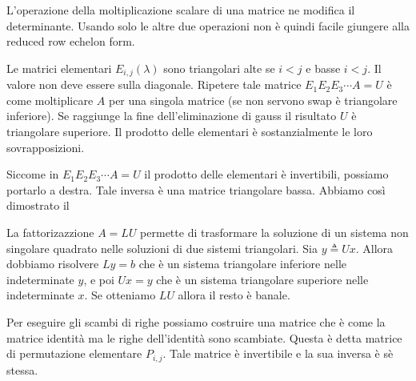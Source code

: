 \documentclass[a4paper]{article}
\begin{document}
L'operazione della moltiplicazione scalare di una matrice ne modifica il determinante.
Usando solo le altre due operazioni non è quindi facile giungere alla reduced row echelon form.

Le matrici elementari \(E_{i,j}(\lambda)\) sono triangolari alte se \(i<j\) e basse \(i<j\).
Il valore non deve essere sulla diagonale.
Ripetere tale matrice \(E_1E_2E_3 \cdots A = U\) è come moltiplicare \(A\) per una singola matrice
(se non servono swap è triangolare inferiore). Se raggiunge la fine dell'eliminazione di gauss il risultato \(U\)
è triangolare superiore.
Il prodotto delle elementari è sostanzialmente le loro sovrapposizioni.





Siccome in \(E_1E_2E_3 \cdots A = U\) il prodotto delle elementari è invertibili, possiamo portarlo a destra.
Tale inversa è una matrice triangolare bassa. Abbiamo così dimostrato il


La fattorizazzione \(A=LU\) permette di trasformare la soluzione di un sistema
non singolare quadrato nelle soluzioni di due sistemi triangolari.
Sia \(y \triangleq Ux\). Allora dobbiamo risolvere
\(Ly = b\) che è un sistema triangolare inferiore nelle indeterminate \(y\),
e poi \(Ux = y\) che è un sistema triangolare superiore nelle indeterminate \(x\).
Se otteniamo \(LU\) allora il resto è banale.

Per eseguire gli scambi di righe possiamo costruire una matrice che è come la matrice
identità ma le righe dell'identità sono scambiate.
Questa è detta matrice di permutazione elementare \(P_{i,j}\).
Tale matrice è invertibile e la sua inversa è sè stessa.
\end{document}
